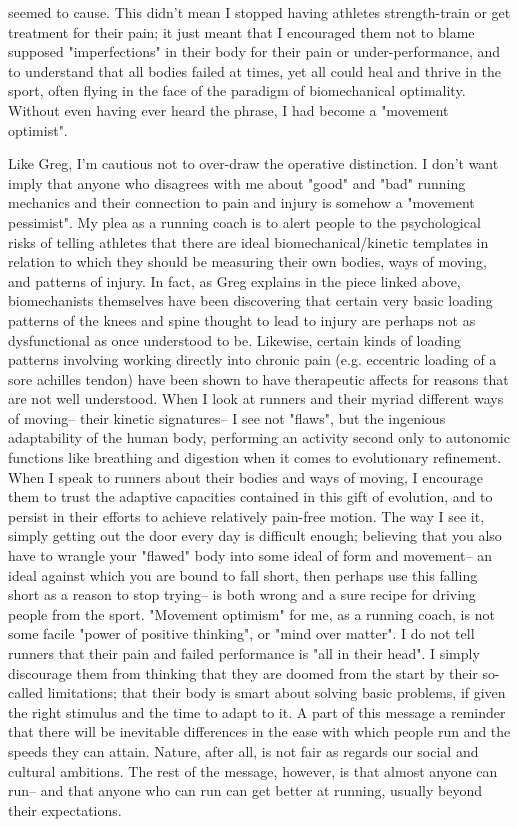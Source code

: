 seemed to cause. This didn't mean I stopped having athletes strength-train or get treatment for their pain; it just meant that I encouraged them not to blame supposed "imperfections" in their body for their pain or under-performance, and to understand that all bodies failed at times, yet all could heal and thrive in the sport, often flying in the face of the paradigm of biomechanical optimality. Without even having ever heard the phrase, I had become a "movement optimist".

Like Greg, I'm cautious not to over-draw the operative distinction. I don't want imply that anyone who disagrees with me about "good" and "bad" running mechanics and their connection to pain and injury is somehow a "movement pessimist". My plea as a running coach is to alert people to the psychological risks of telling athletes that there are ideal biomechanical/kinetic templates in relation to which they should be measuring their own bodies, ways of moving, and patterns of injury. In fact, as Greg explains in the piece linked above, biomechanists themselves have been discovering that certain very basic loading patterns of the knees and spine thought to lead to injury are perhaps not as dysfunctional as once understood to be. Likewise, certain kinds of loading patterns involving working directly into chronic pain (e.g. eccentric loading of a sore achilles tendon) have been shown to have therapeutic affects for reasons that are not well understood. When I look at runners and their myriad different ways of moving-- their kinetic signatures-- I see not "flaws", but the ingenious adaptability of the human body, performing an activity second only to autonomic functions like breathing and digestion when it comes to evolutionary refinement. When I speak to runners about their bodies and ways of moving, I encourage them to trust the adaptive capacities contained in this gift of evolution, and to persist in their efforts to achieve relatively pain-free motion. The way I see it, simply getting out the door every day is difficult enough; believing that you also have to wrangle your "flawed" body into some ideal of form and movement-- an ideal against which you are bound to fall short, then perhaps use this falling short as a reason to stop trying-- is both wrong and a sure recipe for driving people from the sport. "Movement optimism" for me, as a running coach, is not some facile "power of positive thinking", or "mind over matter". I do not tell runners that their pain and failed performance is "all in their head". I simply discourage them from thinking that they are doomed from the start by their so-called limitations; that their body is smart about solving basic problems, if given the right stimulus and the time to adapt to it. A part of this message a reminder that there will be inevitable differences in the ease with which people run and the speeds they can attain. Nature, after all, is not fair as regards our social and cultural ambitions. The rest of the message, however, is that almost anyone can run-- and that anyone who can run can get better at running, usually beyond their expectations.

